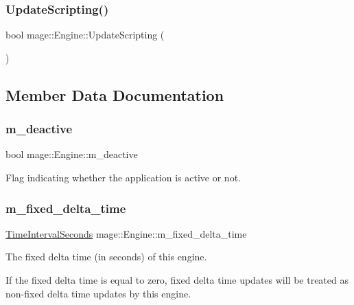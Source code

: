 \subsubsection{\texorpdfstring{Update\+Scripting()}{UpdateScripting()}}
{\footnotesize\ttfamily bool mage\+::\+Engine\+::\+Update\+Scripting (\begin{DoxyParamCaption}{ }\end{DoxyParamCaption})\hspace{0.3cm}{\ttfamily [private]}}



\subsection{Member Data Documentation}
\mbox{\label{classmage_1_1_engine_ab8a4b0157403708ae7d1d018a95b4c63}} 
\subsubsection{\texorpdfstring{m\+\_\+deactive}{m\_deactive}}
{\footnotesize\ttfamily bool mage\+::\+Engine\+::m\+\_\+deactive\hspace{0.3cm}{\ttfamily [private]}}

Flag indicating whether the application is active or not. \mbox{\label{classmage_1_1_engine_a3f7f78eb2dacdf35caed532814fb89e5}} 
\subsubsection{\texorpdfstring{m\+\_\+fixed\+\_\+delta\+\_\+time}{m\_fixed\_delta\_time}}
{\footnotesize\ttfamily \mbox{\hyperlink{namespacemage_a21c3d1575018d1e0720948713c76be1f}{Time\+Interval\+Seconds}} mage\+::\+Engine\+::m\+\_\+fixed\+\_\+delta\+\_\+time\hspace{0.3cm}{\ttfamily [private]}}

The fixed delta time (in seconds) of this engine.

If the fixed delta time is equal to zero, fixed delta time updates will be treated as non-\/fixed delta time updates by this engine. \mbox{\label{classmage_1_1_engine_ab99fae2c87c8c579d3c1b3af9ba19722}} 
